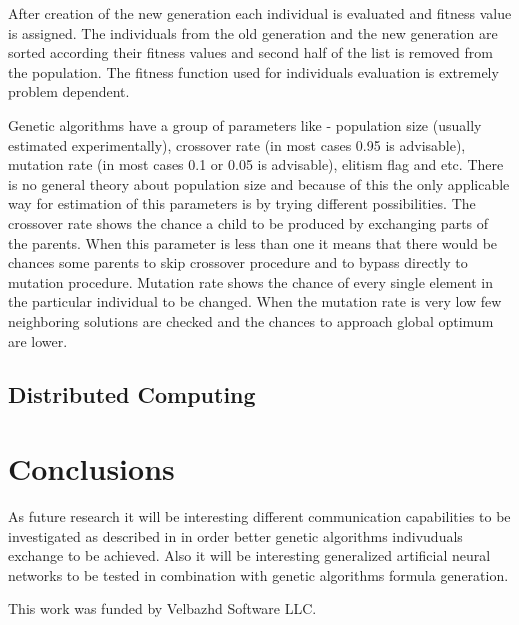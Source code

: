 \documentclass[graybox]{svmult}
\begin{document}
After creation of the new generation each individual is evaluated and fitness value is assigned. The individuals from the old generation and the new generation are sorted according their fitness values and second half of the list is removed from the population. The fitness function used for individuals evaluation is extremely problem dependent. 

Genetic algorithms have a group of parameters like - population size (usually estimated experimentally), crossover rate (in most cases 0.95 is advisable), mutation rate (in most cases 0.1 or 0.05 is advisable), elitism flag and etc. There is no general theory about population size and because of this the only applicable way for estimation of this parameters is by trying different possibilities. The crossover rate shows the chance a child to be produced by exchanging parts of the parents. When this parameter is less than one it means that there would be chances some parents to skip crossover procedure and to bypass directly to mutation procedure. Mutation rate shows the chance of every single element in the particular individual to be changed. When the mutation rate is very low few neighboring solutions are checked and the chances to approach global optimum are lower. 

\subsection{Distributed Computing} \label{Distributed Computing}

\section{Conclusions} \label{Conclusions}

As future research it will be interesting different communication capabilities to be investigated as described in \cite{alexandrov01} in order better genetic algorithms indivuduals exchange to be achieved. Also it will be interesting generalized artificial neural networks \cite{tashev01} to be tested in combination with genetic algorithms formula generation.

\begin{acknowledgement}
This work was funded by Velbazhd Software LLC.
\end{acknowledgement}
\end{document}

